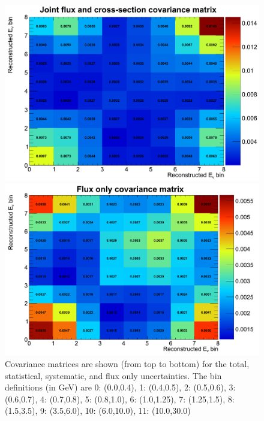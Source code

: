 \begin{figure}[htpb]
\begin{center}
\begin{minipage}[t]{.45\textwidth}
\begin{center}
    \end{center}
  \end{minipage}
  \begin{minipage}[t]{.45\textwidth}
    \begin{center}
      \includegraphics[width=\textwidth] {figures/FluxXSecCovZoom.png}
    \end{center}
  \end{minipage}
  \begin{minipage}[t]{.45\textwidth}
    \begin{center}
      \includegraphics[width=\textwidth] {figures/FluxOnlyCovZoom.png}
    \end{center}
  \end{minipage}
\end{center}
\caption{Covariance matrices are shown (from top to bottom) for the total, statistical, systematic, and flux only uncertainties. The bin definitions (in GeV) are 0: (0.0,0.4), 1: (0.4,0.5), 2: (0.5,0.6), 3: (0.6,0.7), 4: (0.7,0.8), 5: (0.8,1.0), 6: (1.0,1.25), 7: (1.25,1.5), 8: (1.5,3.5), 9: (3.5,6.0), 10: (6.0,10.0), 11: (10.0,30.0)}
\label{fig:covmat}
\end{figure}

